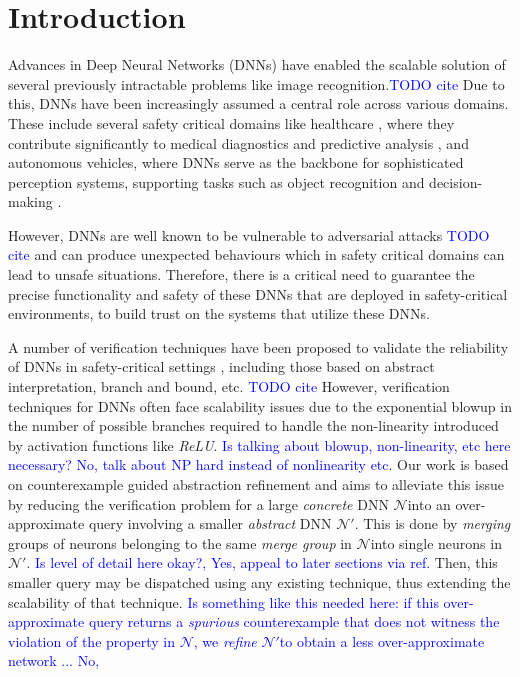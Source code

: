 \documentclass[sigplan,screen,natbib=false]{acmart}
\title{}
\newcommand{\dmcmt}[1]{\textcolor{blue}{#1}}
\newcommand{\relu}{\textit{ReLU}}
\newcommand{\cnc}{$\mathcal{N}$}
\newcommand{\abs}{$\mathcal{N'}$}
\begin{document}
\maketitle

    
\section{Introduction}

Advances in Deep Neural Networks (DNNs) have enabled the scalable solution
of several previously intractable problems like image recognition.\dmcmt{TODO
cite} Due to this, DNNs have been increasingly assumed a central role across
various domains. These include several safety critical domains like healthcare
\cite{b1},
where they contribute significantly to medical diagnostics and predictive
analysis \cite{b2}, and autonomous vehicles, where DNNs serve as the
backbone for sophisticated perception systems, supporting tasks such as object
recognition and decision-making \cite{b3}. 


However, DNNs are well known to be vulnerable to adversarial attacks \dmcmt{TODO
cite} and can produce unexpected behaviours which in safety critical domains can
lead to unsafe situations. Therefore, there is a critical need to guarantee the
precise functionality and safety of these DNNs that are deployed in
safety-critical environments, to build trust on the systems that utilize these
DNNs.

A number of verification techniques have been proposed to validate
the reliability of DNNs in safety-critical settings \cite{b4, b5}, including
those based on abstract interpretation, branch and bound, etc. \dmcmt{ TODO cite
} However, verification techniques for DNNs often
face scalability issues due to the exponential blowup in the number of
possible branches required to handle the non-linearity introduced by activation
functions like \relu. \dmcmt{Is talking about blowup, non-linearity, etc here
necessary? No, talk about NP hard instead of nonlinearity etc.} Our work is based on counterexample guided abstraction refinement
\cite{cegar-nn} and aims to alleviate this issue by reducing the verification
problem for a large \textit{concrete} DNN \cnc into an over-approximate query
involving a smaller \textit{abstract} DNN \abs. This is done by \textit{merging}
groups of neurons belonging to the same \textit{merge group} in \cnc into single
neurons in \abs. \dmcmt{Is level of detail here okay?, Yes, appeal to later
sections via ref.} Then, this smaller query
may be dispatched using any existing technique, thus extending the scalability
of that technique. 
\dmcmt{ Is something like this needed here: if this over-approximate
query returns a \textit{spurious} counterexample that does not witness the
violation of the property in \cnc, we \textit{refine} \abs to obtain a less
over-approximate network ... No, }
\end{document}
